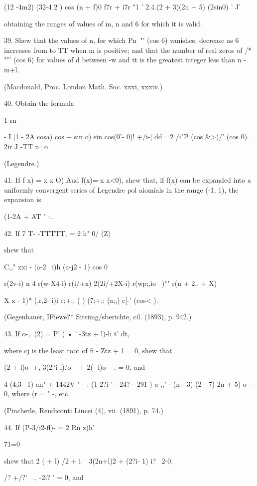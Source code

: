 {{{{(12 -4m2) (32-4 2 ) cos (n + f)0 f7r + i7r "1 ' 2.4.(2 + 3)(2n + 5)
(2sin0) ' J'

obtaining the ranges of values of m, n and 6 for which it is valid.


39. Shew that the values of n, for which Pn~"' (cos 6) vanishes,
decrease as 6 increases from to TT when m is positive; and that the
number of real zeros of /* ""' (cos 6) for values of d between -w and
tt is the greatest integer less than n - m+l.

(Macdonald, Proc. London Math. Soc. xxxi, xxxiv.)

40. Obtain the formula

1 rn- \,

- I [1 - 2A cosa) cos + sin o) sin cos(0'- 0)! +/i-] dd= 2 /i"P (cos
\&>)/' (cos 0). 2ir J -TT n=o

(Legendre.)

41. H f x) = x x O) Aud f(x)=-x x<0), shew that, if f(x) can be
expanded into a uniformly convergent series of Legendre pol aiomials
in the range (-1, 1), the expansion is

 (1-2A + AT " :..

42. If 7 T- -TTTTT, = 2 h" 0/ (Z)

shew that

C,," xxi - (a-2 \ i)h (a-j2 - 1) cos 0

  r(2v-i) n 4 r(w-X4-i) r(i/+x) 2(2i/+2X-i) r(wp;,io ~)"" r(n + 2,. +
X)

X x - 1)* (.r,2- i)i c;+;; ( ) (7;+;; (a;,) c[-' (cos< ).

(Gegenbauer, IFiewe?* Sitsimg/sberichte, cil. (1893), p. 942.)

43. If o-,. (2) = P' ( • ' -3tz + l)-h t' dt,

where cj is the least root of fi - Ztz + 1 = 0, shew that

(2 + l)o- +,-3(2?i-l).'o- \, + 2( -l)o- \ . = 0, and

4 (4;3 \ 1) an" + 1442V " - : (1 2?i-' - 24? - 291 ) a-,,' - (n - 3)
(2 - 7) 2n + 5) o- - 0, where (r = " -, etc.

(Pincherle, Rendiconti Lincei (4), vii. (1891), p. 74.)

44. If (P-3/i2-fl)- = 2 Rn z)h'\

71=0

shew that 2 ( + l) /2 + i ~ 3(2n+l)2 + (2?i- 1) i? \ 2-0,

 /? +/?' \ ., -2i? ' = 0, and

}}}}
